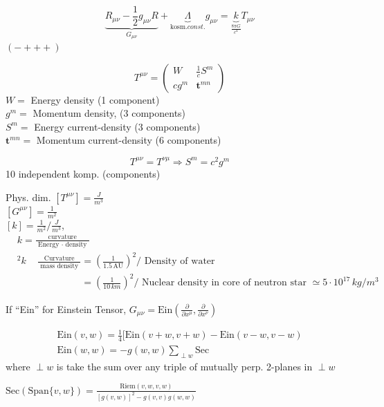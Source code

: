 	\hrulefill
	
	\[
	\underbrace{R_{\mu \nu} - \frac{1}{2}g_{\mu \nu}R}_{G_{\mu \nu}} + \underbrace{\Lambda}_{\text{kosm.} const.} g_{\mu \nu} = \underbrace{k}_{ \frac{ 8 \pi G}{c^4} } T_{\mu \nu}   
	\]
	$(-+++)$
	
	\[
	T^{\mu \nu} = \left( \begin{matrix} W & \frac{1}{c} S^m \\
	c g^m & \mathbf{t}^{mn} \end{matrix} \right)
	\]
	$W = $ Energy density (1 component)\\
	$g^m =$ Momentum density, (3 components) \\
	$S^m = $ Energy current-density (3 components)\\
	$\mathbf{t}^{mn} = $ Momentum current-density (6 components)
	
	\[
	T^{\mu \nu} = T^{\nu \mu} \Longrightarrow S^m = c^2 g^m
	\]
	10 independent komp. (components)
	
	Phys. dim. $[T^{\mu \nu}] = \frac{J}{m^3} $ \\
	\phantom{Phys. dim} $[G^{\mu \nu}] = \frac{1}{m^2}$ \\
	\phantom{Phys. dim} $[k] = \frac{1}{m^2}/ \frac{J}{m^3}$, $\begin{aligned} & k = \frac{ \text{ curvature }}{ \text{ Energy } \cdot \text{ density }} \\
	& ^2 k  \quad \, \frac{ \text{ Curvature } }{ \text{ mass density }} = \left( \frac{1}{1.5 \, \text{AU} } \right)^2/ \text{ Density of water } \\
	& \phantom{^2 k  \quad \, \frac{ \text{ Curvature } }{ \text{ mass density }}} = \left( \frac{1}{ 10 \, km} \right)^2 / \text{ Nuclear density in core of neutron star  } \simeq 5 \cdot 10^{17} \, kg/m^3 \end{aligned}$
	
	If ``Ein'' for Einstein Tensor, $G_{\mu \nu} = \text{Ein}\left( \frac{ \partial }{ \partial x^{\mu }}, \frac{ \partial }{ \partial x^{\nu }} \right)$
	
	\[
	\begin{gathered}
	\text{Ein}(v,w) = \frac{1}{4} [ \text{Ein}(v+w,v+w) - \text{Ein}(v-w,v-w)  \\
	\text{Ein}(w,w) = -g(w,w) \sum_{\perp w } \text{Sec}
	\end{gathered}
	\]
	where $\perp w$ is take the sum over any triple of mutually perp. 2-planes in $\perp w$
	
	$\text{Sec}(\text{Span}\lbrace v,w \rbrace) = \frac{ \text{Riem}(v,w,v,w) }{ [g(v,w)]^2 - g(v,v)g(w,w) }$
	

